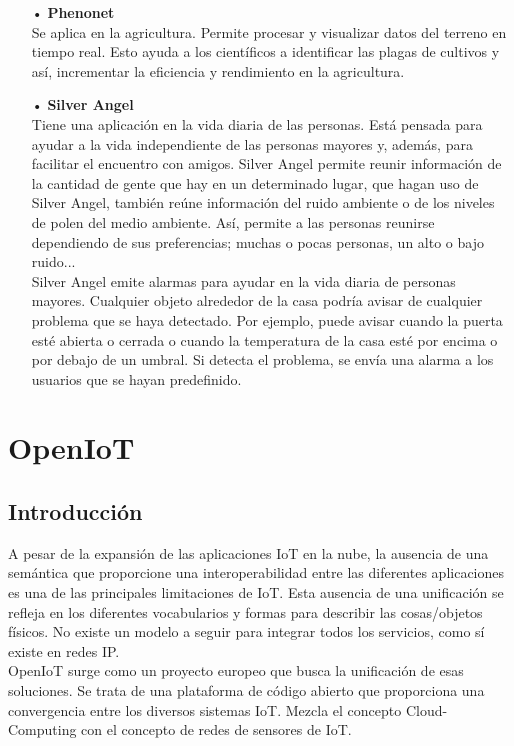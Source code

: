 \documentclass[12pt, twoside]{book}
\begin{document}
\begin{itemize}
\item[•]\textbf{Phenonet}\\
Se aplica en la agricultura. Permite procesar y visualizar datos del terreno en tiempo real. Esto ayuda a los científicos a identificar las plagas de cultivos y así, incrementar la eficiencia y rendimiento en la agricultura. 
\item[•]\textbf{Silver Angel}\\
Tiene una aplicación en la vida diaria de las personas. Está pensada para ayudar a la vida independiente de las personas mayores y, además, para facilitar el encuentro con amigos. Silver Angel permite reunir información de la cantidad de gente que hay en un determinado lugar, que hagan uso de Silver Angel, también reúne información del ruido ambiente o de los niveles de polen del medio ambiente. Así, permite a las personas reunirse dependiendo de sus preferencias; muchas o pocas personas, un alto o bajo ruido...
\\
Silver Angel emite alarmas para ayudar en la vida diaria de personas mayores. Cualquier objeto alrededor de la casa podría avisar de cualquier problema que se haya detectado. Por ejemplo, puede avisar cuando la puerta esté abierta o cerrada o cuando la temperatura de la casa esté por encima o por debajo de un umbral. Si detecta el problema, se envía una alarma a los usuarios que se hayan predefinido.
\end{itemize}

\chapter{OpenIoT}
\section{Introducción}
A pesar de la expansión de las aplicaciones IoT en la nube, la ausencia de una semántica que proporcione una interoperabilidad entre las diferentes aplicaciones es una de las principales limitaciones de IoT. Esta ausencia de una unificación se refleja en los diferentes vocabularios y formas para describir las cosas/objetos físicos. No existe un modelo a seguir para integrar todos los servicios, como sí existe en redes IP. \\

OpenIoT surge como un proyecto europeo que busca la unificación de esas soluciones. Se trata de una plataforma de código abierto que proporciona una convergencia entre los diversos sistemas IoT. Mezcla el concepto Cloud-Computing con el concepto de redes de sensores de IoT.\\ 
\end{document}
